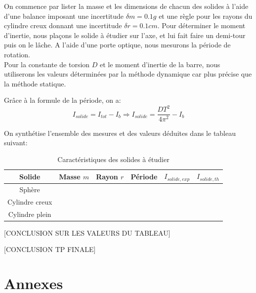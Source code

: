 \documentclass[12pt]{article}
\begin{document}
On commence par lister la masse et les dimensions de chacun des solides à l'aide d'une balance imposant une incertitude $\delta m = 0.1g$
et une règle pour les rayons du cylindre creux donnant une incertitude $\delta r = 0.1cm$. Pour déterminer le moment d'inertie, nous plaçons le solide à étudier sur l'axe, et lui fait faire un demi-tour puis on le lâche. A l'aide d'une porte optique,
nous mesurons la période de rotation. \\ 
Pour la constante de torsion $D$ et le moment d'inertie de la barre, nous utiliserons les valeurs déterminées par la méthode dynamique car plus précise que la méthode
statique.

Grâce à la formule de la période, on a:
\begin{equation}
    I_{solide} = I_{tot} - I_b \Rightarrow I_{solide} = \frac{DT^2}{4\pi^2} - I_b
\end{equation}

On synthétise l'ensemble des mesures et des valeurs déduites dans le tableau suivant:

\begin{table}[h!]
	\centering
	\begin{tabular}{||c c c c c c||} 
		\hline
		Solide          & Masse $m$  & Rayon $r$  & Période & $I_{solide,exp}$ & $I_{solide,th}$    \\
		\hline
        Sphère          &            &          &           &                  &                    \\
        Cylindre creux  &            &          &           &                  &                    \\
        Cylindre plein  &            &          &           &                  &                    \\
		\hline
	\end{tabular}
	\caption{Caractéristiques des solides à étudier}
	\label{table:1}
\end{table}

[CONCLUSION SUR LES VALEURS DU TABLEAU]

[CONCLUSION TP FINALE]

\break
\section{Annexes}
\end{document}
